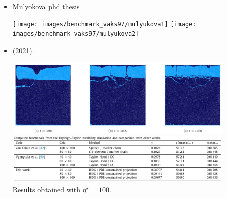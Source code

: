 \begin{itemize}
\begin{center}
\texttt{[image: images/benchmark\_vaks97/aspect\_vof/rms\_vel\_comparison.png]}
\texttt{[image: images/benchmark\_vaks97/aspect\_vof/vof\_van\_keken\_refinement\_comparison.png]}\\
{\captionfont 
Left:
Evolution of the root mean square velocity as a function of time for computations 
of the van Keken problem made with the VOF interface tracking algorithm with five 
different global mesh refinements (from a $32 \times 32$ mesh 
to a $1024 \times 1024$ mesh.
Right:
The results of two computations of the van Keken problem made with the VOF 
interface tracking algorithm overlaid upon each other at $t_\text{end}=2000$.
This visualization shows the reconstructed boundary between the two
materials at the final time $t_\text{end}$ as computed on a uniform grid
with 7 and 8 levels of refinement.
The boundaries between the materials are displayed as contours
of the fields $\tilde{\psi}^7(t_\text{end})$ (black) and
$\tilde{\psi}^8\,(t_\text{end})$ (bright green), which are generated by the  visualization postprocessor.
The contours for the reconstructed material boundaries are superimposed
on a color gradient visualization of the material composition for the
computation with 8 levels of refinement in order to make the regions
with each fluid type more evident.   }
\end{center}

\item Mulyokova phd thesis \cite{mulyukova} 

\begin{center}
\texttt{[image: images/benchmark\_vaks97/mulyukova1]}
\texttt{[image: images/benchmark\_vaks97/mulyukova2]}
\end{center}

\item \textcite{mars21b} (2021). 

\begin{center}
\includegraphics[width=11cm]{images/benchmark_vaks97/mars21b_a}\\
\includegraphics[width=11cm]{images/benchmark_vaks97/mars21b_b}\\
{\captionfont Results obtained with $\eta^\star=100$.}
\end{center}


\end{itemize}
